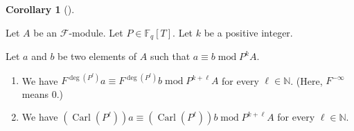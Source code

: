 \documentclass[numbers=enddot,12pt,final,onecolumn,notitlepage]{scrartcl}%
\theoremstyle{definition}
\newtheorem{coro}[theo]{Corollary}
\newenvironment{corollary}[1][]
{\begin{coro}[#1]\begin{leftbar}}
{\end{leftbar}\end{coro}}
\begin{document}
\begin{corollary}
\label{cor.F.lift.lift-Pl}Let $A$ be an $\mathcal{F}$-module. Let
$P\in\mathbb{F}_{q}\left[  T\right]  $. Let $k$ be a positive integer.

Let $a$ and $b$ be two elements of $A$ such that $a\equiv b\operatorname{mod}%
P^{k}A$.

\begin{enumerate}
\item[\textbf{(a)}] We have $F^{\deg\left(  P^{\ell}\right)  }a\equiv
F^{\deg\left(  P^{\ell}\right)  }b\operatorname{mod}P^{k+\ell}A$ for every
$\ell\in\mathbb{N}$. (Here, $F^{-\infty}$ means $0$.)

\item[\textbf{(b)}] We have $\left(  \operatorname*{Carl}\left(  P^{\ell
}\right)  \right)  a\equiv\left(  \operatorname*{Carl}\left(  P^{\ell}\right)
\right)  b\operatorname{mod}P^{k+\ell}A$ for every $\ell\in\mathbb{N}$.
\end{enumerate}
\end{corollary}
\end{document}
